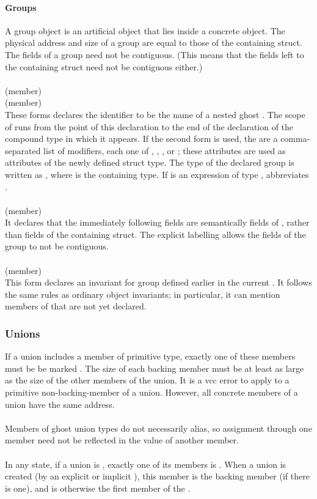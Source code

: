 \documentclass[preprint,nocopyrightspace]{sigplanconf}
\newcommand{\subsubsubsection}[1]{\paragraph{#1}}
\begin{document}
{{{\subsubsubsection{Groups}
A group object is an artificial object that lies inside a
concrete  object. The physical address and size of a group
are equal to those of the containing struct. The fields of a group
need not be contiguous. (This means that the fields left to the
containing struct need not be contiguous either.)
\\\\
\noindent{} (member)\\
 (member)\\
These forms declares the identifier  to be the name of a nested
ghost . The scope of  runs from the point of this
declaration to the end of the declaration of the compound type in
which it appears.
If the second form is used,
the  are a comma-separated list of modifiers,
each one of , , ,
or ; these attributes are used as attributes of the
newly defined struct type.
The type of the declared group is written as , where 
is the containing  type. If  is an expression of
type ,  abbreviates .
\\\\
 (member)\\
It declares that the immediately
following fields are semantically fields of , rather than fields of
the containing struct. The explicit labelling allows the fields of the
group to not be contiguous.
\\\\
 (member)\\
This form declares an invariant for group  defined earlier in
the current . It follows the same rules as ordinary object
invariants; in particular, it can mention members of  that are
not yet declared.

\subsubsection{Unions}
If a union includes a member of primitive type, exactly one of
these members must be be marked . The size of
each backing member must be at least as large as the size of the other
members of the union. It is a vcc error to apply \vcc{&} to a 
primitive non-backing-member of a union. However, all concrete members of a
union have the same address.
\\\\
Members of ghost union types do not necessarily alias, so assignment
through one member need not be reflected in the value of another
member.  
\\\\
In any state, if a union is \vcc{\valid}, exactly one of its members
is \vcc{\valid}. When a union is created (by an explicit or
implicit \vcc{\unblobify}), this member is the backing member (if
there is one), and is otherwise the first member of the .

}}}
\end{document}
